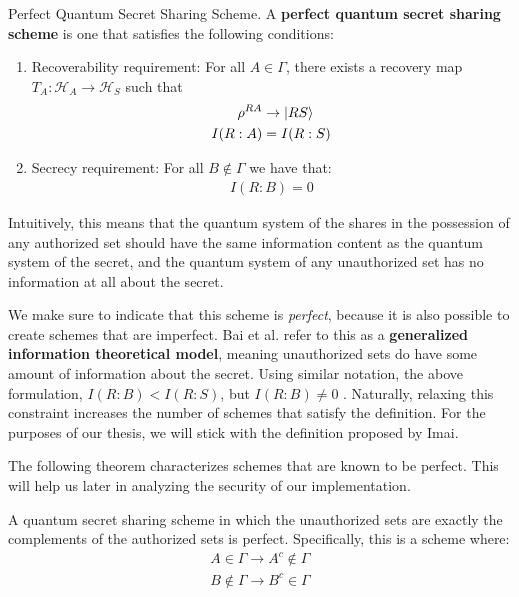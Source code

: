 \begin{definition}{Perfect Quantum Secret Sharing Scheme.}
    \label{defn:perfect-qss}
    A \textbf{perfect quantum secret sharing scheme} is one that satisfies the following conditions:
    \begin{enumerate}
        \item Recoverability requirement: For all $A \in \Gamma$, there exists a recovery map $T_A: \mathcal{H}_A \to \mathcal{H}_S$ such that 
        \begin{align} 
            \rho^{RA} &\to \ket{RS} \\
            I(R:A) &= I(R:S)
        \end{align}
        \item Secrecy requirement: For all $B \notin \Gamma$ we have that:
        \begin{align}
            I(R:B) = 0
        \end{align}
    \end{enumerate}
    Intuitively, this means that the quantum system of the shares in the possession of any authorized set should have the same information content as the quantum system of the secret, and the quantum system of any unauthorized set has no information at all about the secret.
\end{definition}

We make sure to indicate that this scheme is \textit{perfect}, because it is also possible to create schemes that are imperfect. Bai et al. refer to this as a \textbf{generalized information theoretical model}, meaning unauthorized sets do have some amount of information about the secret. Using similar notation, the above formulation, $I(R:B) < I(R:S)$, but $I(R:B) \neq 0$ \cite{bai_generalized_2016}. Naturally, relaxing this constraint increases the number of schemes that satisfy the definition. For the purposes of our thesis, we will stick with the definition proposed by Imai.

The following theorem characterizes schemes that are known to be perfect. This will help us later in analyzing the security of our implementation.

\begin{theorem}
    A quantum secret sharing scheme in which the unauthorized sets are exactly the complements of the authorized sets is perfect. Specifically, this is a scheme where:
    \begin{align}
        A \in \Gamma \to A^c \notin \Gamma \\ 
        B \notin \Gamma \to B^c \in \Gamma
    \end{align}
\end{theorem}

